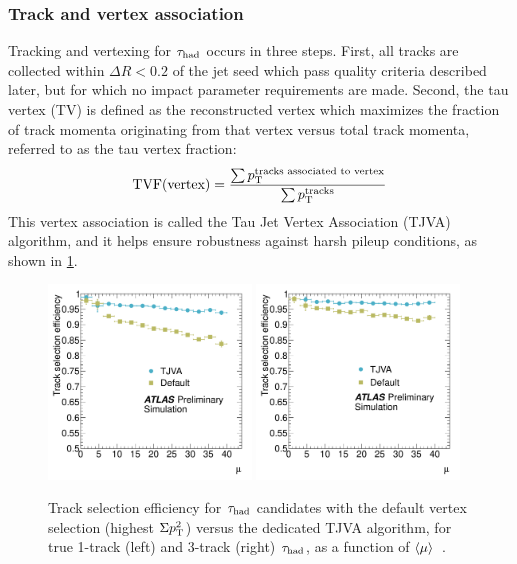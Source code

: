 \subsubsection{Track and vertex association}

Tracking and vertexing for $\tau_\text{had}$ occurs in three steps. First, all tracks are collected within $\Delta R < 0.2$ of the jet seed which pass quality criteria described later, but for which no impact parameter requirements are made. Second, the tau vertex (TV) is defined as the reconstructed vertex which maximizes the fraction of track momenta originating from that vertex versus total track momenta, referred to as the tau vertex fraction:
%
\begin{equation}
  \begin{split}
    \text{TVF}(\text{vertex}) &= \frac{\sum \pt^\text{tracks associated to vertex}}{\sum \pt^\text{tracks}} \\
  \end{split}
  \label{eqn:taus-tvf}
\end{equation}
%
This vertex association is called the Tau Jet Vertex Association (TJVA) algorithm, and it helps ensure robustness against harsh pileup conditions, as shown in \cref{fig:taus-tjva}.

\begin{figure}[tp]
  \centering
  \includegraphics[width=0.48\textwidth]{figures/ATLAS-CONF-2012-142/fig_01a}
  \includegraphics[width=0.48\textwidth]{figures/ATLAS-CONF-2012-142/fig_01b}
  \caption{Track selection efficiency for $\tau_\text{had}$ candidates with the default vertex selection (highest $\Sigma p_{\mathrm{T}}^2$) versus the dedicated TJVA algorithm, for true 1-track (left) and 3-track (right) $\tau_\text{had}$, as a function of $\langle\mu\rangle$~\cite{ATLAS-CONF-2012-142}.}
  \label{fig:taus-tjva}
\end{figure}

